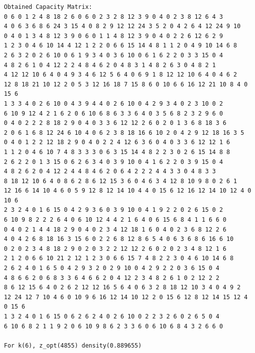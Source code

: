 \documentclass[11pt]{article}
\begin{document}
\begin{lstlisting}
Obtained Capacity Matrix:
0 6 0 1 2 4 8 18 2 6 0 6 0 2 3 2 8 12 3 9 0 4 0 2 3 8 12 6 4 3
4 0 6 3 6 8 6 24 3 15 4 0 8 2 9 12 12 24 3 5 2 0 4 2 6 4 12 24 9 10
0 4 0 1 3 4 8 12 3 9 0 6 0 1 1 4 8 12 3 9 0 4 0 2 2 6 12 6 2 9
1 2 3 0 4 6 10 14 4 12 1 2 2 0 6 6 15 14 4 8 1 1 2 0 4 9 10 14 6 8
2 6 3 2 0 2 6 10 0 6 1 9 3 4 0 3 6 10 0 6 1 6 2 2 0 3 3 15 0 4
4 8 2 6 1 0 4 12 2 2 4 8 4 6 2 0 4 8 3 1 4 8 2 6 3 0 4 8 2 1
4 12 12 10 6 4 0 4 9 3 4 6 12 5 6 4 0 6 9 1 8 12 12 10 6 4 0 4 6 2
12 8 18 21 10 12 2 0 5 3 12 16 18 7 15 8 6 0 10 6 6 16 12 21 10 8 4 0 15 6
1 3 3 4 0 2 6 10 0 4 3 9 4 4 0 2 6 10 0 4 2 9 3 4 0 2 3 10 0 2
6 10 9 12 4 2 1 6 2 0 6 10 6 8 6 3 3 6 4 0 3 5 6 8 2 3 2 9 6 0
0 4 0 2 2 2 8 18 2 9 0 4 0 3 3 6 12 12 2 6 0 2 0 1 3 6 8 18 3 6
2 0 6 1 6 8 12 24 6 10 4 0 6 2 3 8 18 16 6 10 2 0 4 2 9 12 18 16 3 5
0 4 0 1 2 2 12 18 2 9 0 4 0 2 2 4 12 6 3 6 0 4 0 3 3 6 12 12 1 6
1 1 2 0 4 6 10 7 4 8 3 3 3 0 6 3 15 14 4 8 2 2 3 0 2 6 15 14 8 8
2 6 2 2 0 1 3 15 0 6 2 6 3 4 0 3 9 10 0 4 1 6 2 2 0 3 9 15 0 4
4 8 2 6 2 0 4 12 2 4 4 8 4 6 2 0 6 4 2 2 2 4 4 3 3 0 4 8 3 3
8 18 12 10 6 4 0 8 6 2 8 6 12 15 3 6 0 4 6 3 4 12 8 10 9 8 0 2 6 1
12 16 6 14 10 4 6 0 5 9 12 8 12 14 10 4 4 0 15 6 12 16 12 14 10 12 4 0 10 6
2 3 2 4 0 1 6 15 0 4 2 9 3 6 0 3 9 10 0 4 1 9 2 2 0 2 6 15 0 2
6 10 9 8 2 2 2 6 4 0 6 10 12 4 4 2 1 6 4 0 6 15 6 8 4 1 1 6 6 0
0 4 0 2 1 4 4 18 2 9 0 4 0 2 3 4 12 18 1 6 0 4 0 2 3 6 8 12 2 6
4 0 4 2 6 8 18 16 3 15 6 0 2 2 6 8 12 8 6 5 4 0 6 3 6 8 6 16 6 10
0 2 0 2 3 4 8 18 2 9 0 2 0 3 2 2 12 12 2 6 0 2 0 2 3 4 8 12 1 6
2 1 2 0 6 6 10 21 2 12 1 2 3 0 6 6 15 7 4 8 2 2 3 0 4 6 10 14 6 8
2 6 2 4 0 1 6 5 0 4 2 9 3 2 0 2 9 10 0 4 2 9 2 2 0 3 6 15 0 4
4 8 6 6 2 0 6 8 3 3 6 4 6 6 2 0 4 12 2 3 4 8 2 6 1 0 2 12 2 2
8 6 12 15 6 4 0 2 6 2 12 12 16 5 6 4 0 6 3 2 8 18 12 10 3 4 0 4 9 2
12 24 12 7 10 4 6 0 10 9 6 16 12 14 10 12 2 0 15 6 12 8 12 14 15 12 4 0 15 6
1 3 2 4 0 1 6 15 0 6 2 6 2 4 0 2 6 10 0 2 2 3 2 6 0 2 6 5 0 4
6 10 6 8 2 1 1 9 2 0 6 10 9 8 6 2 3 3 6 0 6 10 6 8 4 3 2 6 6 0

For k(6), z_opt(4855) density(0.889655)


\end{lstlisting}
\end{document}
